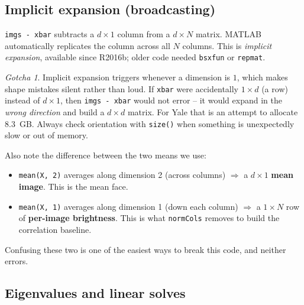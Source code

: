 \documentclass[11pt]{article}
\theoremstyle{definition}
\theoremstyle{remark}
\newtheorem*{gotcha}{Gotcha}
\begin{document}
\subsection{Implicit expansion (broadcasting)}

\texttt{imgs - xbar} subtracts a $d\times1$ column from a $d\times N$
matrix. MATLAB automatically replicates the column across all $N$ columns. This is
\emph{implicit expansion}, available since R2016b; older code needed
\texttt{bsxfun} or \texttt{repmat}.

\begin{gotcha}
Implicit expansion triggers whenever a dimension is $1$, which makes shape mistakes
silent rather than loud. If \texttt{xbar} were accidentally $1\times d$ (a row)
instead of $d\times1$, then \texttt{imgs - xbar} would not error -- it would
expand in the \emph{wrong direction} and build a $d\times d$ matrix. For Yale that
is an attempt to allocate $8.3$~GB. Always check orientation with
\texttt{size()} when something is unexpectedly slow or out of memory.
\end{gotcha}

Also note the difference between the two means we use:
\begin{itemize}[nosep]
\item \texttt{mean(X, 2)} averages along dimension 2 (across columns) $\Rightarrow$
  a $d\times1$ \textbf{mean image}. This is the mean face.
\item \texttt{mean(X, 1)} averages along dimension 1 (down each column)
  $\Rightarrow$ a $1\times N$ row of \textbf{per-image brightness}. This is what
  \texttt{normCols} removes to build the correlation baseline.
\end{itemize}
Confusing these two is one of the easiest ways to break this code, and neither
errors.

\subsection{Eigenvalues and linear solves}
\end{document}
